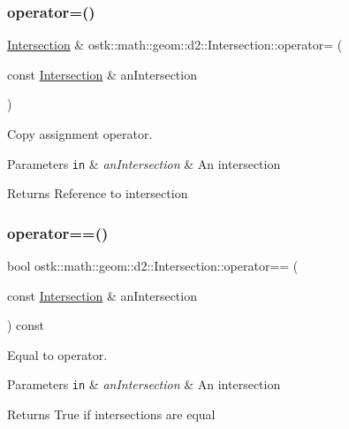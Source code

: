 \subsubsection{\texorpdfstring{operator=()}{operator=()}}
{\footnotesize\ttfamily \hyperlink{classostk_1_1math_1_1geom_1_1d2_1_1_intersection}{Intersection} \& ostk\+::math\+::geom\+::d2\+::\+Intersection\+::operator= (\begin{DoxyParamCaption}\item[{const \hyperlink{classostk_1_1math_1_1geom_1_1d2_1_1_intersection}{Intersection} \&}]{an\+Intersection }\end{DoxyParamCaption})}



Copy assignment operator. 


\begin{DoxyParams}[1]{Parameters}
\mbox{\tt in}  & {\em an\+Intersection} & An intersection \\
\hline
\end{DoxyParams}
\begin{DoxyReturn}{Returns}
Reference to intersection 
\end{DoxyReturn}
\mbox{\label{classostk_1_1math_1_1geom_1_1d2_1_1_intersection_a840b26425c0c8f35a8530c338821851f}} 
\subsubsection{\texorpdfstring{operator==()}{operator==()}}
{\footnotesize\ttfamily bool ostk\+::math\+::geom\+::d2\+::\+Intersection\+::operator== (\begin{DoxyParamCaption}\item[{const \hyperlink{classostk_1_1math_1_1geom_1_1d2_1_1_intersection}{Intersection} \&}]{an\+Intersection }\end{DoxyParamCaption}) const}



Equal to operator. 


\begin{DoxyParams}[1]{Parameters}
\mbox{\tt in}  & {\em an\+Intersection} & An intersection \\
\hline
\end{DoxyParams}
\begin{DoxyReturn}{Returns}
True if intersections are equal 
\end{DoxyReturn}
\mbox{\label{classostk_1_1math_1_1geom_1_1d2_1_1_intersection_a26cc1aec3f2576ec97f0cd54aea9d935}} 
